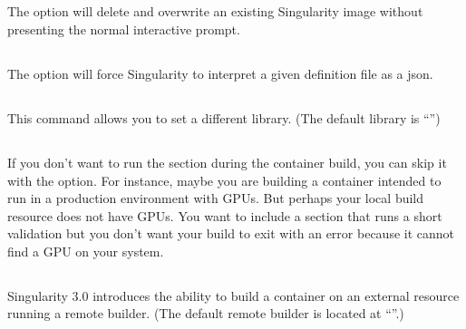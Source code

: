 \documentclass[letterpaper,10pt,english]{sphinxmanual}
\begin{document}
\subsection{}
\label{\detokenize{build_a_container:force}}
The  option will delete and overwrite an existing Singularity image
without presenting the normal interactive prompt.


\subsection{}
\label{\detokenize{build_a_container:json}}
The  option will force Singularity to interpret a given definition
file as a json.


\subsection{}
\label{\detokenize{build_a_container:library}}
This command allows you to set a different library.  (The default library is
“”)


\subsection{}
\label{\detokenize{build_a_container:notest}}
If you don’t want to run the  section during the container build, you can
skip it with the  option. For instance, maybe you are building a
container intended to run in a production environment with GPUs. But
perhaps your local build resource does not have GPUs. You want to
include a  section that runs a short validation but you don’t want your
build to exit with an error because it cannot find a GPU on your system.


\subsection{}
\label{\detokenize{build_a_container:remote}}
Singularity 3.0 introduces the ability to build a container on an external
resource running a remote builder.  (The default remote builder is located at
“”.)
\end{document}
